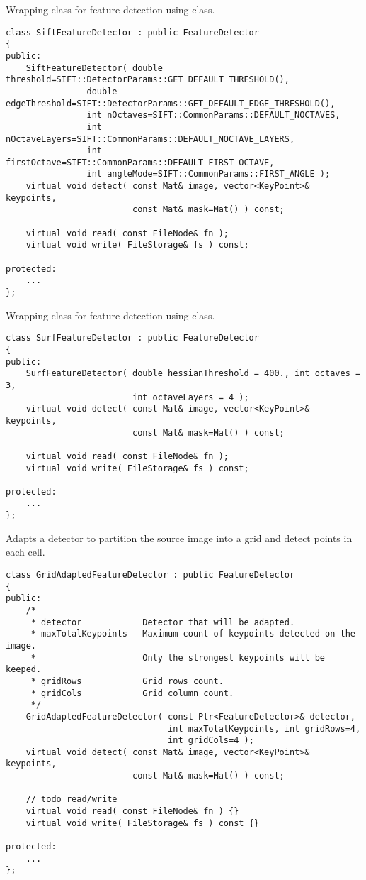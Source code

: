 Wrapping class for feature detection using  class.

\begin{lstlisting}
class SiftFeatureDetector : public FeatureDetector
{
public:
    SiftFeatureDetector( double threshold=SIFT::DetectorParams::GET_DEFAULT_THRESHOLD(),
                double edgeThreshold=SIFT::DetectorParams::GET_DEFAULT_EDGE_THRESHOLD(),
                int nOctaves=SIFT::CommonParams::DEFAULT_NOCTAVES,
                int nOctaveLayers=SIFT::CommonParams::DEFAULT_NOCTAVE_LAYERS,
                int firstOctave=SIFT::CommonParams::DEFAULT_FIRST_OCTAVE,
                int angleMode=SIFT::CommonParams::FIRST_ANGLE );
    virtual void detect( const Mat& image, vector<KeyPoint>& keypoints, 
                         const Mat& mask=Mat() ) const;

    virtual void read( const FileNode& fn );
    virtual void write( FileStorage& fs ) const;

protected:
	...
};
\end{lstlisting}

Wrapping class for feature detection using  class.

\begin{lstlisting}
class SurfFeatureDetector : public FeatureDetector
{
public:
    SurfFeatureDetector( double hessianThreshold = 400., int octaves = 3,
                         int octaveLayers = 4 );
    virtual void detect( const Mat& image, vector<KeyPoint>& keypoints, 
                         const Mat& mask=Mat() ) const;
                         
    virtual void read( const FileNode& fn );
    virtual void write( FileStorage& fs ) const;

protected:
	...
};
\end{lstlisting}

Adapts a detector to partition the source image into a grid and detect 
points in each cell.

\begin{lstlisting}
class GridAdaptedFeatureDetector : public FeatureDetector
{
public:
    /*
     * detector            Detector that will be adapted.
     * maxTotalKeypoints   Maximum count of keypoints detected on the image. 
     *                     Only the strongest keypoints will be keeped.
     * gridRows            Grid rows count.
     * gridCols            Grid column count.
     */
    GridAdaptedFeatureDetector( const Ptr<FeatureDetector>& detector, 
                                int maxTotalKeypoints, int gridRows=4, 
                                int gridCols=4 );
    virtual void detect( const Mat& image, vector<KeyPoint>& keypoints, 
                         const Mat& mask=Mat() ) const;

    // todo read/write
    virtual void read( const FileNode& fn ) {}
    virtual void write( FileStorage& fs ) const {}

protected:
    ...
};
\end{lstlisting}


